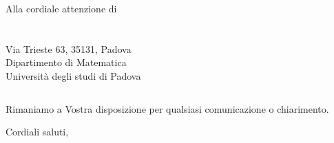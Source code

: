 \documentclass[a4paper]{letter}
\begin{document}
\begin{letter} {Alla cordiale attenzione di \\ \TV \\ \RC \\ Via Trieste 63, 35131, Padova\\ Dipartimento di Matematica \\ Università degli studi di Padova }
\begin{longtable}{
			>{\centering}p{}
			>{\centering}p{}
			>{\centering\arraybackslash}p{} }
		\end{longtable}
	Rimaniamo a Vostra disposizione per qualsiasi comunicazione o chiarimento.\\

\closing{
  Cordiali saluti,
}

\end{letter}
\end{document}
